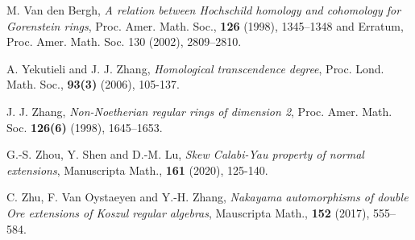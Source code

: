 \documentclass[a4paper,10pt]{amsart}
\theoremstyle{definition}
\numberwithin{equation}{section}
\begin{document}
\begin{thebibliography}{10}
M. Van den Bergh, \emph{A relation between Hochschild homology and cohomology for Gorenstein rings}, Proc. Amer. Math. Soc., \textbf{126} (1998), 1345--1348 and Erratum, Proc. Amer. Math. Soc. 130 (2002), 2809--2810.



A. Yekutieli and J. J. Zhang, {\em Homological transcendence degree}, Proc. Lond. Math. Soc.,  \textbf{93(3)} (2006), 105-137.

J. J. Zhang, \emph{Non-Noetherian regular rings of dimension 2}, Proc. Amer. Math. Soc. \textbf{126(6)} (1998), 1645--1653.
%

G.-S. Zhou, Y. Shen and D.-M. Lu, \emph{Skew Calabi-Yau property of normal extensions}, Manuscripta Math., \textbf{161} (2020), 125-140.

C. Zhu, F. Van Oystaeyen and Y.-H. Zhang, \emph{Nakayama automorphisms of double Ore extensions of Koszul regular algebras}, Mauscripta Math., \textbf{152} (2017), 555--584.



\end{thebibliography}
\end{document}

